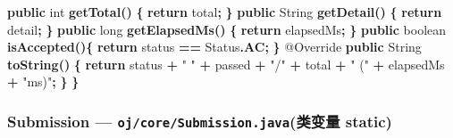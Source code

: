 \documentclass[
  11pt,
]{ctexart}
\newenvironment{Shaded}{\begin{snugshade}}{\end{snugshade}}
\newcommand{\AttributeTok}[1]{\textcolor[rgb]{0.13,0.29,0.53}{#1}}
\newcommand{\BuiltInTok}[1]{#1}
\newcommand{\ControlFlowTok}[1]{\textcolor[rgb]{0.13,0.29,0.53}{\textbf{#1}}}
\newcommand{\DataTypeTok}[1]{\textcolor[rgb]{0.13,0.29,0.53}{#1}}
\newcommand{\FunctionTok}[1]{\textcolor[rgb]{0.13,0.29,0.53}{\textbf{#1}}}
\newcommand{\KeywordTok}[1]{\textcolor[rgb]{0.13,0.29,0.53}{\textbf{#1}}}
\newcommand{\NormalTok}[1]{#1}
\newcommand{\OperatorTok}[1]{\textcolor[rgb]{0.81,0.36,0.00}{\textbf{#1}}}
\newcommand{\StringTok}[1]{\textcolor[rgb]{0.31,0.60,0.02}{#1}}
\begin{document}
\begin{Shaded}
\begin{Highlighting}[]
    \KeywordTok{public} \DataTypeTok{int} \FunctionTok{getTotal}\OperatorTok{()}      \OperatorTok{\{} \ControlFlowTok{return}\NormalTok{ total}\OperatorTok{;} \OperatorTok{\}}
    \KeywordTok{public} \BuiltInTok{String} \FunctionTok{getDetail}\OperatorTok{()}  \OperatorTok{\{} \ControlFlowTok{return}\NormalTok{ detail}\OperatorTok{;} \OperatorTok{\}}
    \KeywordTok{public} \DataTypeTok{long} \FunctionTok{getElapsedMs}\OperatorTok{()} \OperatorTok{\{} \ControlFlowTok{return}\NormalTok{ elapsedMs}\OperatorTok{;} \OperatorTok{\}}
    \KeywordTok{public} \DataTypeTok{boolean} \FunctionTok{isAccepted}\OperatorTok{()\{} \ControlFlowTok{return}\NormalTok{ status }\OperatorTok{==}\NormalTok{ Status}\OperatorTok{.}\FunctionTok{AC}\OperatorTok{;} \OperatorTok{\}}
    \AttributeTok{@Override} \KeywordTok{public} \BuiltInTok{String} \FunctionTok{toString}\OperatorTok{()} \OperatorTok{\{}
        \ControlFlowTok{return}\NormalTok{ status }\OperatorTok{+} \StringTok{" "} \OperatorTok{+}\NormalTok{ passed }\OperatorTok{+} \StringTok{"/"} \OperatorTok{+}\NormalTok{ total }\OperatorTok{+} \StringTok{" ("} \OperatorTok{+}\NormalTok{ elapsedMs }\OperatorTok{+} \StringTok{"ms)"}\OperatorTok{;}
    \OperatorTok{\}}
\OperatorTok{\}}
\end{Highlighting}
\end{Shaded}

\hypertarget{submission-ojcoresubmission.javaux7c7bux53d8ux91cf-static}{%
\subsubsection{\texorpdfstring{Submission ---
\texttt{oj/core/Submission.java}(类变量
static)}{Submission --- oj/core/Submission.java(类变量 static)}}\label{submission-ojcoresubmission.javaux7c7bux53d8ux91cf-static}}
\end{document}
